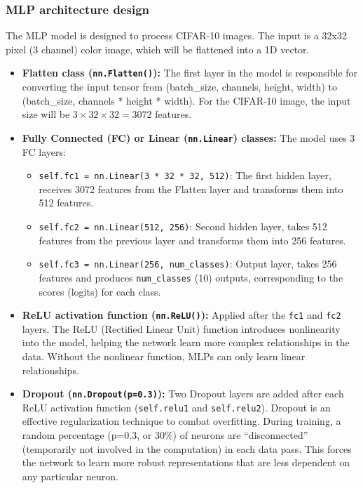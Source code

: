 \documentclass[12pt]{article}
\begin{document}
\subsubsection{MLP architecture design}
The MLP model is designed to process CIFAR-10 images. The input is a 32x32 pixel (3 channel) color image, which will be flattened into a 1D vector.
\begin{itemize}
    \item \textbf{Flatten class (\texttt{nn.Flatten()}):} The first layer in the model is responsible for converting the input tensor from (batch\_size, channels, height, width) to (batch\_size, channels * height * width). For the CIFAR-10 image, the input size will be $3 \times 32 \times 32 = 3072$ features.
    \item \textbf{Fully Connected (FC) or Linear (\texttt{nn.Linear}) classes:} The model uses 3 FC layers:
    \begin{itemize}
        \item \texttt{self.fc1 = nn.Linear(3 * 32 * 32, 512)}: The first hidden layer, receives 3072 features from the Flatten layer and transforms them into 512 features.
        \item \texttt{self.fc2 = nn.Linear(512, 256)}: Second hidden layer, takes 512 features from the previous layer and transforms them into 256 features.
        \item \texttt{self.fc3 = nn.Linear(256, num\_classes)}: Output layer, takes 256 features and produces \texttt{num\_classes} (10) outputs, corresponding to the scores (logits) for each class.
    \end{itemize}
    \item \textbf{ReLU activation function (\texttt{nn.ReLU()}):} Applied after the \texttt{fc1} and \texttt{fc2} layers. The ReLU (Rectified Linear Unit) function introduces nonlinearity into the model, helping the network learn more complex relationships in the data. Without the nonlinear function, MLPs can only learn linear relationships.
    \item \textbf{Dropout (\texttt{nn.Dropout(p=0.3)}):} Two Dropout layers are added after each ReLU activation function (\texttt{self.relu1} and \texttt{self.relu2}). Dropout is an effective regularization technique to combat overfitting. During training, a random percentage (p=0.3, or 30\%) of neurons are “disconnected” (temporarily not involved in the computation) in each data pass. This forces the network to learn more robust representations that are less dependent on any particular neuron.
\end{itemize}
\end{document}
